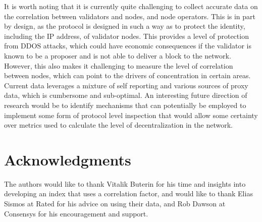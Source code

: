\documentclass[conference]{IEEEtran}
\begin{document}
It is worth noting that it is currently quite challenging to collect accurate data on the  correlation between validators and nodes, and node operators.  This is in part by design, as the protocol is designed in such a way as to protect the identity, including the IP address, of validator nodes.  This provides a level of protection from DDOS attacks, which could have economic consequences if the validator is known to be a proposer and is not able to deliver a block to the network.  However, this also makes it challenging to measure the level of correlation between nodes, which can point to the drivers of concentration in certain areas. Current data leverages a mixture of self reporting and various sources of proxy data, which is cumbersome and sub-optimal. An interesting future direction of research would be to identify mechanisms that can potentially be employed to implement some form of protocol level inspection that would allow some certainty over metrics used to calculate the level of decentralization in the network.

\vspace{8pt}

\section*{Acknowledgments}

The authors would like to thank Vitalik Buterin for his time and insights into developing an index that uses a correlation factor, and would like to thank Elias Sismos at Rated for his advice on using their data, and Rob Dawson at Consensys for his encouragement and support.

\vspace{12pt}

\printbibliography
\end{document}
